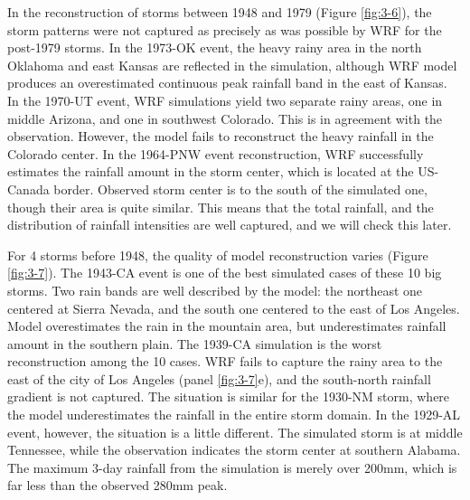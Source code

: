 In the reconstruction of storms between 1948 and 1979 (Figure \ref{fig:3-6}), the storm patterns were not captured as precisely as was possible by WRF for the post-1979 storms. In the 1973-OK event, the heavy rainy area in the north Oklahoma and east Kansas are reflected in the simulation, although WRF model produces an overestimated continuous peak rainfall band in the east of Kansas. In the 1970-UT event, WRF simulations yield two separate rainy areas, one in middle Arizona, and one in southwest Colorado. This is in agreement with the observation. However, the model fails to reconstruct the heavy rainfall in the Colorado center. In the 1964-PNW event reconstruction, WRF successfully estimates the rainfall amount in the storm center, which is located at the US-Canada border. Observed storm center is to the south of the simulated one, though their area is quite similar. This means that the total rainfall, and the distribution of rainfall intensities are well captured, and we will check this later.

For 4 storms before 1948, the quality of model reconstruction varies (Figure \ref{fig:3-7}). The 1943-CA event is one of the best simulated cases of these 10 big storms. Two rain bands are well described by the model: the northeast one centered at Sierra Nevada, and the south one centered to the east of Los Angeles. Model overestimates the rain in the mountain area, but underestimates rainfall amount in the southern plain. The 1939-CA simulation is the worst reconstruction among the 10 cases. WRF fails to capture the rainy area to the east of the city of Los Angeles (panel \ref{fig:3-7}e), and the south-north rainfall gradient is not captured. The situation is similar for the 1930-NM storm, where the model underestimates the rainfall in the entire storm domain. In the 1929-AL event, however, the situation is a little different. The simulated storm is at middle Tennessee, while the observation indicates the storm center at southern Alabama. The maximum 3-day rainfall from the simulation is merely over 200mm, which is far less than the observed 280mm peak.

